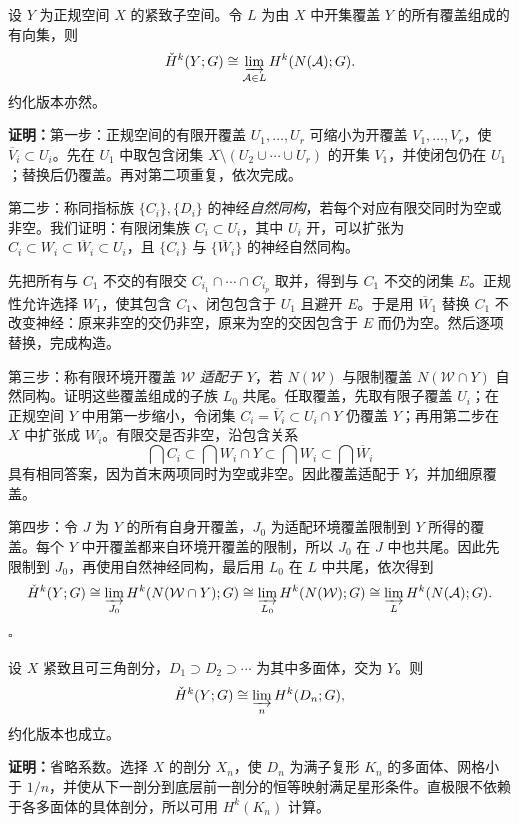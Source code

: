 设 $Y$ 为正规空间 $X$ 的紧致子空间。令 $L$ 为由 $X$ 中开集覆盖 $Y$ 的所有覆盖组成的有向集，则
\[\check H^k(Y;G)\cong\varinjlim_{\mathcal A\in L}H^k(N(\mathcal A);G).\]
约化版本亦然。

\textbf{证明：}第一步：正规空间的有限开覆盖 $U_1,\ldots,U_r$ 可缩小为开覆盖 $V_1,\ldots,V_r$，使 $\overline V_i\subset U_i$。先在 $U_1$ 中取包含闭集 $X\setminus(U_2\cup\cdots\cup U_r)$ 的开集 $V_1$，并使闭包仍在 $U_1$；替换后仍覆盖。再对第二项重复，依次完成。

第二步：称同指标族 $\{C_i\},\{D_i\}$ 的神经\emph{自然同构}，若每个对应有限交同时为空或非空。我们证明：有限闭集族 $C_i\subset U_i$，其中 $U_i$ 开，可以扩张为 $C_i\subset W_i\subset\overline W_i\subset U_i$，且 $\{C_i\}$ 与 $\{\overline W_i\}$ 的神经自然同构。

先把所有与 $C_1$ 不交的有限交 $C_{i_1}\cap\cdots\cap C_{i_p}$ 取并，得到与 $C_1$ 不交的闭集 $E$。正规性允许选择 $W_1$，使其包含 $C_1$、闭包包含于 $U_1$ 且避开 $E$。于是用 $\overline W_1$ 替换 $C_1$ 不改变神经：原来非空的交仍非空，原来为空的交因包含于 $E$ 而仍为空。然后逐项替换，完成构造。

第三步：称有限环境开覆盖 $\mathcal W$ \emph{适配于 $Y$}，若 $N(\mathcal W)$ 与限制覆盖 $N(\mathcal W\cap Y)$ 自然同构。证明这些覆盖组成的子族 $L_0$ 共尾。任取覆盖，先取有限子覆盖 $U_i$；在正规空间 $Y$ 中用第一步缩小，令闭集 $C_i=\overline V_i\subset U_i\cap Y$ 仍覆盖 $Y$；再用第二步在 $X$ 中扩张成 $W_i$。有限交是否非空，沿包含关系
\[\bigcap C_i\subset\bigcap W_i\cap Y\subset\bigcap W_i\subset\bigcap\overline W_i\]
具有相同答案，因为首末两项同时为空或非空。因此覆盖适配于 $Y$，并加细原覆盖。

第四步：令 $J$ 为 $Y$ 的所有自身开覆盖，$J_0$ 为适配环境覆盖限制到 $Y$ 所得的覆盖。每个 $Y$ 中开覆盖都来自环境开覆盖的限制，所以 $J_0$ 在 $J$ 中也共尾。因此先限制到 $J_0$，再使用自然神经同构，最后用 $L_0$ 在 $L$ 中共尾，依次得到
\[\check H^k(Y;G)\cong\varinjlim_{J_0}H^k(N(\mathcal W\cap Y);G)
\cong\varinjlim_{L_0}H^k(N(\mathcal W);G)
\cong\varinjlim_LH^k(N(\mathcal A);G).\]
\hfill$\square$

设 $X$ 紧致且可三角剖分，$D_1\supset D_2\supset\cdots$ 为其中多面体，交为 $Y$。则
\[\check H^k(Y;G)\cong\varinjlim_nH^k(D_n;G),\]
约化版本也成立。

\textbf{证明：}省略系数。选择 $X$ 的剖分 $X_n$，使 $D_n$ 为满子复形 $K_n$ 的多面体、网格小于 $1/n$，并使从下一剖分到底层前一剖分的恒等映射满足星形条件。直极限不依赖于各多面体的具体剖分，所以可用 $H^k(K_n)$ 计算。

